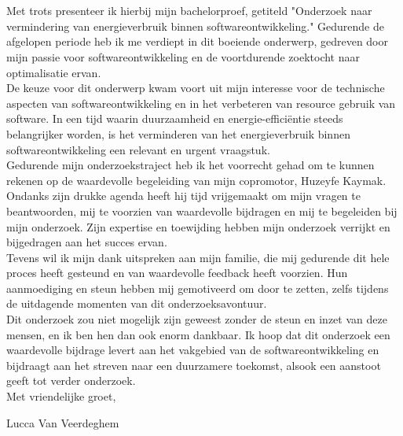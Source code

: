 
\chapter*{}%
\label{ch:voorwoord}


Met trots presenteer ik hierbij mijn bachelorproef, getiteld "Onderzoek naar vermindering van energieverbruik binnen softwareontwikkeling." Gedurende de afgelopen periode heb ik me verdiept in dit boeiende onderwerp, gedreven door mijn passie voor softwareontwikkeling en de voortdurende zoektocht naar optimalisatie ervan.\\

De keuze voor dit onderwerp kwam voort uit mijn interesse voor de technische aspecten van softwareontwikkeling en in het verbeteren van resource gebruik van software. In een tijd waarin duurzaamheid en energie-efficiëntie steeds belangrijker worden, is het verminderen van het energieverbruik binnen softwareontwikkeling een relevant en urgent vraagstuk.\\

Gedurende mijn onderzoekstraject heb ik het voorrecht gehad om te kunnen rekenen op de waardevolle begeleiding van mijn copromotor, Huzeyfe Kaymak. Ondanks zijn drukke agenda heeft hij tijd vrijgemaakt om mijn vragen te beantwoorden, mij te voorzien van waardevolle bijdragen en mij te begeleiden bij mijn onderzoek. Zijn expertise en toewijding hebben mijn onderzoek verrijkt en bijgedragen aan het succes ervan.\\

Tevens wil ik mijn dank uitspreken aan mijn familie, die mij gedurende dit hele proces heeft gesteund en van waardevolle feedback heeft voorzien. Hun aanmoediging en steun hebben mij gemotiveerd om door te zetten, zelfs tijdens de uitdagende momenten van dit onderzoeksavontuur.\\

Dit onderzoek zou niet mogelijk zijn geweest zonder de steun en inzet van deze mensen, en ik ben hen dan ook enorm dankbaar. Ik hoop dat dit onderzoek een waardevolle bijdrage levert aan het vakgebied van de softwareontwikkeling en bijdraagt aan het streven naar een duurzamere toekomst, alsook een aanstoot geeft tot verder onderzoek.\\

Met vriendelijke groet,

Lucca Van Veerdeghem